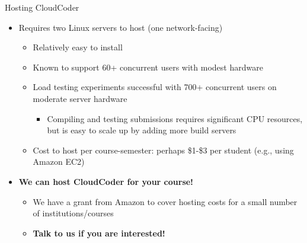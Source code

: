 \documentclass{beamer}
\begin{document}
\begin{frame}{Hosting CloudCoder}

\begin{itemize}
  \item Requires two Linux servers to host (one network-facing)
    \begin{itemize}
    \item Relatively easy to install
    \item Known to support 60+ concurrent users with modest hardware
    \item Load testing experiments successful with 700+ concurrent users
          on moderate server hardware
      \begin{itemize}
      \item Compiling and testing submissions requires significant
            CPU resources, but is easy to scale up by adding more
            build servers
      \end{itemize}
    \item Cost to host per course-semester: perhaps \$1-\$3 per student
          (e.g., using Amazon EC2)
    \end{itemize}
  \item {\bf We can host CloudCoder for your course!}
    \begin{itemize}
    \item We have a grant from Amazon to cover hosting costs for
          a small number of institutions/courses
    \item {\bf Talk to us if you are interested!}
    \end{itemize}
\end{itemize}

\end{frame}

\end{document}
